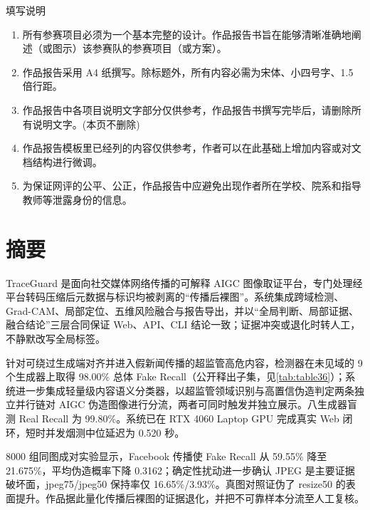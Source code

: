 \documentclass[UTF8, a4paper, 12pt]{ctexart}
\begin{document}
\thispagestyle{empty}
\begin{center}
  {\heiti{} 填写说明}
\end{center}
\vspace{0.5\baselineskip}
\begin{enumerate}[label=\arabic*., leftmargin=2em, itemsep=0.3\baselineskip]
  \item 所有参赛项目必须为一个基本完整的设计。作品报告书旨在能够清晰准确地阐述（或图示）该参赛队的参赛项目（或方案）。
  \item 作品报告采用 A4 纸撰写。除标题外，所有内容必需为宋体、小四号字、1.5 倍行距。
  \item 作品报告中各项目说明文字部分仅供参考，作品报告书撰写完毕后，请删除所有说明文字。(本页不删除)
  \item 作品报告模板里已经列的内容仅供参考，作者可以在此基础上增加内容或对文档结构进行微调。
  \item 为保证网评的公平、公正，作品报告中应避免出现作者所在学校、院系和指导教师等泄露身份的信息。
\end{enumerate}
\newpage

\renewcommand{\contentsname}{目\hspace{2em}录}
{\let\clearpage\relax \tableofcontents}
\newpage

\section*{摘要}

TraceGuard 是面向社交媒体网络传播的可解释 AIGC 图像取证平台，专门处理经平台转码压缩后元数据与标识均被剥离的“传播后裸图”。系统集成跨域检测、Grad-CAM、局部定位、五维风险融合与报告导出，并以“全局判断、局部证据、融合结论”三层合同保证 Web、API、CLI 结论一致；证据冲突或退化时转人工，不静默改写全局标签。

针对可绕过生成端对齐并进入假新闻传播的超监管高危内容\cite{mu2025exda}，检测器在未见域的 9 个生成器上取得 98.00\% 总体 Fake Recall（公开释出子集，见\cref{tab:table36}）；系统进一步集成轻量级内容语义分类器，以超监管领域识别与高置信伪造判定两条独立并行链对 AIGC 伪造图像进行分流，两者可同时触发并独立展示。八生成器盲测 Real Recall 为 99.80\%。系统已在 RTX 4060 Laptop GPU 完成真实 Web 闭环，短时并发烟测中位延迟为 0.520 秒。

8000 组同图成对实验显示，Facebook 传播使 Fake Recall 从 59.55\% 降至 21.675\%，平均伪造概率下降 0.3162；确定性扰动进一步确认 JPEG 是主要证据破坏面，jpeg75/jpeg50 保持率仅 16.65\%/3.93\%。真图对照证伪了 resize50 的表面提升。作品据此量化传播后裸图的证据退化，并把不可靠样本分流至人工复核。
\end{document}
